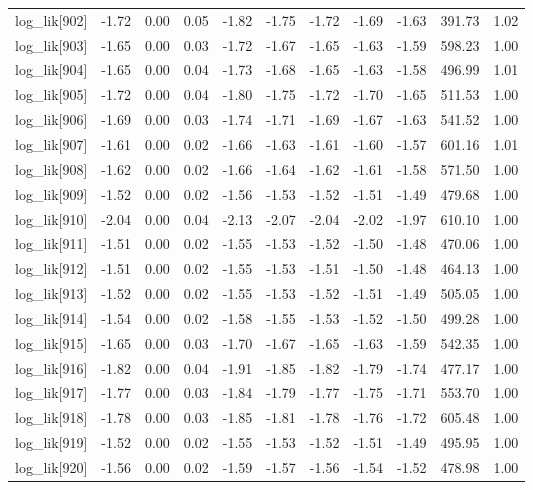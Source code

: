 \begin{table}[ht]
\begin{tabular}{rrrrrrrrrrr}
  log\_lik[902] & -1.72 & 0.00 & 0.05 & -1.82 & -1.75 & -1.72 & -1.69 & -1.63 & 391.73 & 1.02 \\ 
  log\_lik[903] & -1.65 & 0.00 & 0.03 & -1.72 & -1.67 & -1.65 & -1.63 & -1.59 & 598.23 & 1.00 \\ 
  log\_lik[904] & -1.65 & 0.00 & 0.04 & -1.73 & -1.68 & -1.65 & -1.63 & -1.58 & 496.99 & 1.01 \\ 
  log\_lik[905] & -1.72 & 0.00 & 0.04 & -1.80 & -1.75 & -1.72 & -1.70 & -1.65 & 511.53 & 1.00 \\ 
  log\_lik[906] & -1.69 & 0.00 & 0.03 & -1.74 & -1.71 & -1.69 & -1.67 & -1.63 & 541.52 & 1.00 \\ 
  log\_lik[907] & -1.61 & 0.00 & 0.02 & -1.66 & -1.63 & -1.61 & -1.60 & -1.57 & 601.16 & 1.01 \\ 
  log\_lik[908] & -1.62 & 0.00 & 0.02 & -1.66 & -1.64 & -1.62 & -1.61 & -1.58 & 571.50 & 1.00 \\ 
  log\_lik[909] & -1.52 & 0.00 & 0.02 & -1.56 & -1.53 & -1.52 & -1.51 & -1.49 & 479.68 & 1.00 \\ 
  log\_lik[910] & -2.04 & 0.00 & 0.04 & -2.13 & -2.07 & -2.04 & -2.02 & -1.97 & 610.10 & 1.00 \\ 
  log\_lik[911] & -1.51 & 0.00 & 0.02 & -1.55 & -1.53 & -1.52 & -1.50 & -1.48 & 470.06 & 1.00 \\ 
  log\_lik[912] & -1.51 & 0.00 & 0.02 & -1.55 & -1.53 & -1.51 & -1.50 & -1.48 & 464.13 & 1.00 \\ 
  log\_lik[913] & -1.52 & 0.00 & 0.02 & -1.55 & -1.53 & -1.52 & -1.51 & -1.49 & 505.05 & 1.00 \\ 
  log\_lik[914] & -1.54 & 0.00 & 0.02 & -1.58 & -1.55 & -1.53 & -1.52 & -1.50 & 499.28 & 1.00 \\ 
  log\_lik[915] & -1.65 & 0.00 & 0.03 & -1.70 & -1.67 & -1.65 & -1.63 & -1.59 & 542.35 & 1.00 \\ 
  log\_lik[916] & -1.82 & 0.00 & 0.04 & -1.91 & -1.85 & -1.82 & -1.79 & -1.74 & 477.17 & 1.00 \\ 
  log\_lik[917] & -1.77 & 0.00 & 0.03 & -1.84 & -1.79 & -1.77 & -1.75 & -1.71 & 553.70 & 1.00 \\ 
  log\_lik[918] & -1.78 & 0.00 & 0.03 & -1.85 & -1.81 & -1.78 & -1.76 & -1.72 & 605.48 & 1.00 \\ 
  log\_lik[919] & -1.52 & 0.00 & 0.02 & -1.55 & -1.53 & -1.52 & -1.51 & -1.49 & 495.95 & 1.00 \\ 
  log\_lik[920] & -1.56 & 0.00 & 0.02 & -1.59 & -1.57 & -1.56 & -1.54 & -1.52 & 478.98 & 1.00 \\ 

\end{tabular}
\end{table}
